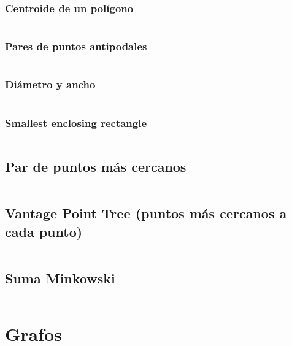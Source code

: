 \documentclass[11pt]{article}
\begin{document}
			\subsubsection{Centroide de un polígono}
			\inputminted[tabsize=2,breaklines,firstline=264,lastline=274,fontsize=\small]{c++}{geometry.cpp}
			
			\subsubsection{Pares de puntos antipodales}
			\inputminted[tabsize=2,breaklines,firstline=341,lastline=352,fontsize=\small]{c++}{geometry.cpp}
			
			\subsubsection{Diámetro y ancho}
			\inputminted[tabsize=2,breaklines,firstline=354,lastline=368,fontsize=\small]{c++}{geometry.cpp}
			
			\subsubsection{Smallest enclosing rectangle}
			\inputminted[tabsize=2,breaklines,firstline=370,lastline=389,fontsize=\small]{c++}{geometry.cpp}
		
		\subsection{Par de puntos más cercanos}
		\inputminted[tabsize=2,breaklines,firstline=236,lastline=262,fontsize=\small]{c++}{geometry.cpp}
		
		\subsection{Vantage Point Tree (puntos más cercanos a cada punto)}
		\inputminted[tabsize=2,breaklines,firstline=276,lastline=339,fontsize=\small]{c++}{geometry.cpp}
		
		\subsection{Suma Minkowski}
		\inputminted[tabsize=2,breaklines,firstline=496,lastline=517,fontsize=\small]{c++}{geometry.cpp}
		
	\newpage
	\section{Grafos}
\end{document}

